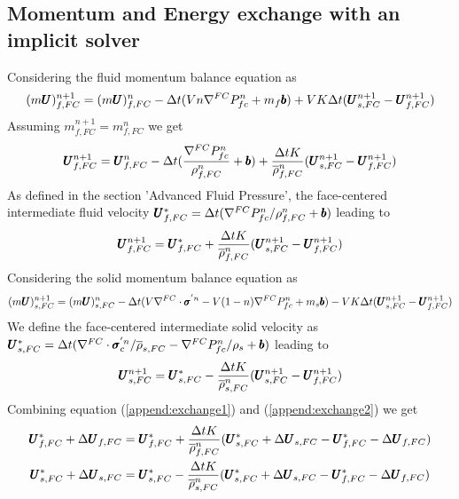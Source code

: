 \documentclass[preprint,12pt]{elsarticle}
\begin{document}
\subsection{\textsf{Momentum and Energy exchange with an implicit solver}}
%
%
Considering the fluid momentum balance equation as 
%
\begin{equation}
  (m\pmb{U})_{f,FC}^{n+1} =  (m\pmb{U})_{f,FC}^{n} - \Delta{t} (V n \nabla^{FC} P_{fc}^{n} + m_f \pmb{b}) + V K \Delta{t} (\pmb{U}_{s,FC}^{n+1} - \pmb{U}_{f,FC}^{n+1})
\end {equation}
%
%
Assuming $m_{f,FC}^{n+1} = m_{f,FC}^n$ we get
%
\begin{equation}
  \pmb{U}_{f,FC}^{n+1} =  \pmb{U}_{f,FC}^{n} - \Delta{t} (\frac{\nabla^{FC} P_{fc}^{n}} {\rho_{f,FC}^n} + \pmb{b}) + \frac{\Delta{t} K}{\overline{\rho}_{f,FC}^n} (\pmb{U}_{s,FC}^{n+1} - \pmb{U}_{f,FC}^{n+1})
\end {equation}
%
%
As defined in the section 'Advanced Fluid Pressure', the face-centered intermediate fluid velocity $\pmb{U}_{f,FC}^{*} = \Delta{t} (\nabla^{FC} P_{fc}^{n} / \rho_{f,FC}^n + \pmb{b})$ leading to
%
\begin{equation}
\label{append:exchange1}
  \pmb{U}_{f,FC}^{n+1} =  \pmb{U}_{f,FC}^{*} +  \frac{\Delta{t} K}{\overline{\rho}_{f,FC}^n} (\pmb{U}_{s,FC}^{n+1} - \pmb{U}_{f,FC}^{n+1})
\end {equation}
%
%
Considering the solid momentum balance equation as
%
\begin{equation}
  (m\pmb{U})_{s,FC}^{n+1} =  (m\pmb{U})_{s,FC}^{n} - \Delta{t} (V \nabla^{FC} \cdot \pmb{\sigma}^{'n} - V (1-n) \nabla^{FC} P_{fc}^{n} + m_s \pmb{b}) - V K \Delta{t} (\pmb{U}_{s,FC}^{n+1} - \pmb{U}_{f,FC}^{n+1})
\end {equation}
%
%
We define the face-centered intermediate solid velocity as $\pmb{U}_{s,FC}^{*} = \Delta{t} (\nabla^{FC} \cdot \pmb{\sigma}_c^{'n} / \overline{\rho}_{s,FC}  - \nabla^{FC} P_{fc}^{n} / \rho_s + \pmb{b})$ leading to
%
\begin{equation}
\label{append:exchange2}
  \pmb{U}_{s,FC}^{n+1} =  \pmb{U}_{s,FC}^{*} -  \frac{\Delta{t} K}{\overline{\rho}_{s,FC}^n} (\pmb{U}_{s,FC}^{n+1} - \pmb{U}_{f,FC}^{n+1})
\end {equation}
%
%
Combining equation (\ref{append:exchange1}) and (\ref{append:exchange2}) we get
%
\begin{equation}
\begin{gathered}
\label{append:exchange3}
  \pmb{U}_{f,FC}^{*} + \Delta \pmb{U}_{f,FC} =  \pmb{U}_{f,FC}^{*} +  \frac{\Delta{t} K}{\overline{\rho}_{f,FC}^n} (\pmb{U}_{s,FC}^{*} + \Delta \pmb{U}_{s,FC} - \pmb{U}_{f,FC}^{*} - \Delta \pmb{U}_{f,FC}) \\
  \pmb{U}_{s,FC}^{*} + \Delta \pmb{U}_{s,FC} =  \pmb{U}_{s,FC}^{*} -  \frac{\Delta{t} K}{\overline{\rho}_{s,FC}^n} (\pmb{U}_{s,FC}^{*} + \Delta \pmb{U}_{s,FC} - \pmb{U}_{f,FC}^{*} - \Delta \pmb{U}_{f,FC})
\end {gathered}
\end {equation}
\end{document}

